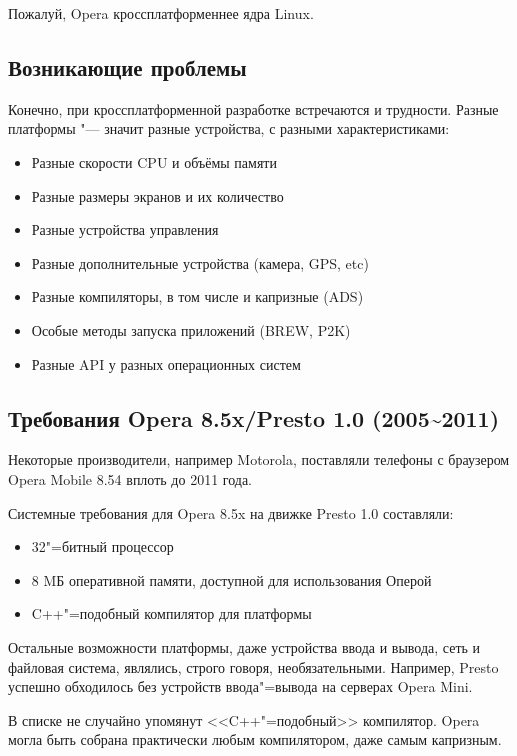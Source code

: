 \documentclass[10pt, a5paper]{article}
\begin{document}
Пожалуй, Opera кроссплатформеннее ядра Linux.

\subsection*{Возникающие проблемы}

Конечно, при кроссплатформенной разработке встречаются и трудности. Разные платформы "--- значит разные устройства, с разными характеристиками:

\begin{itemize}
  \item Разные скорости CPU и объёмы памяти
  \item Разные размеры экранов и их количество
  \item Разные устройства управления
  \item Разные дополнительные устройства (камера, GPS, etc)
  \item Разные компиляторы, в том числе и капризные (ADS)
  \item Особые методы запуска приложений (BREW, P2K)
  \item Разные API у разных операционных систем
\end{itemize}

\subsection*{Требования Opera 8.5x/Presto 1.0 (2005\~{}2011)}

Некоторые производители, например Motorola, поставляли телефоны с браузером Opera Mobile 8.54 вплоть до 2011 года.

Системные требования для Opera 8.5x на движке Presto 1.0 составляли:

\begin{itemize}
  \item 32"=битный процессор
  \item 8 MБ оперативной памяти, доступной для использования Оперой
  \item C++"=подобный компилятор для платформы
\end{itemize}

Остальные возможности платформы, даже устройства ввода и вывода, сеть и файловая система, являлись, строго говоря, необязательными. Например, Presto успешно обходилось без устройств ввода"=вывода на серверах Opera Mini.

В списке не случайно упомянут <<C++"=подобный>> компилятор. Opera могла быть собрана практически любым компилятором, даже самым капризным.
\end{document}
